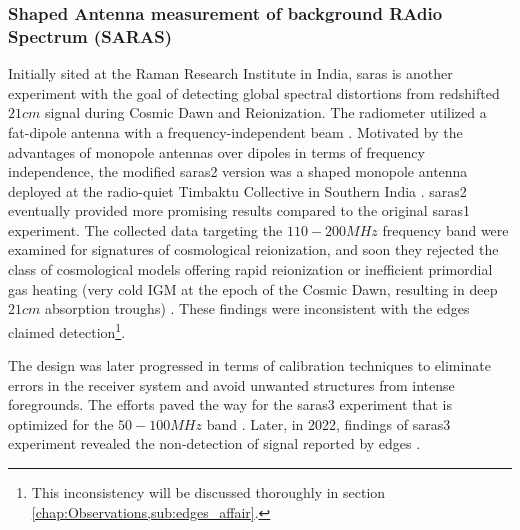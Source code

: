\documentclass[12pt, TexShade, letterpaper]{report}
\begin{document}
\subsubsection{Shaped Antenna measurement of background RAdio Spectrum (SARAS)} 
Initially sited at the Raman Research Institute in India, \gls{saras} is another experiment with the goal of detecting global spectral distortions from redshifted $21cm$ signal during Cosmic Dawn and Reionization. The radiometer utilized a fat-dipole antenna with a frequency-independent beam \cite{saras_1}. Motivated by the advantages of monopole antennas over dipoles in terms of frequency independence, the modified \gls{saras}2 version was a shaped monopole antenna deployed at the radio-quiet Timbaktu Collective in Southern India \cite{saras_2}. \gls{saras}2 eventually provided more promising results compared to the original \gls{saras}1 experiment. The collected data targeting the $110-200 MHz$ frequency band were examined for signatures of cosmological reionization, and soon they rejected the class of cosmological models offering rapid reionization or inefficient primordial gas heating (very cold IGM at the epoch of the Cosmic Dawn, resulting in deep $21cm$ absorption troughs) \cite{saras_2_constrains, saras_2_results}. These findings were inconsistent with the \gls{edges} claimed detection\footnote{This inconsistency will be discussed thoroughly in section \ref{chap:Observations,sub:edges_affair}.}\cite{dark_ages_space, thesis_shedding, saras_curse_edges}.\par
The design was later progressed in terms of calibration techniques to eliminate errors in the receiver system and avoid unwanted structures from intense foregrounds. The efforts paved the way for the \gls{saras}3 experiment that is optimized for the $50-100 MHz$ band \cite{saras_3, dark_ages_space}. Later, in 2022, findings of \gls{saras}3 experiment revealed the non-detection of signal reported by \gls{edges} \cite{saras_3_results}.\par
\end{document}
